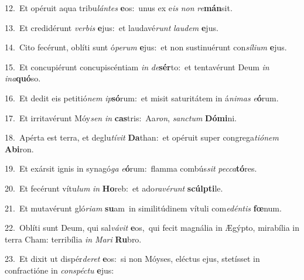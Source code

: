 {\numbfont\textcolor{\numbcolor}{12.}}~Et opéruit aqua tribu\-\textit{lán}\-\textit{tes} \textbf{e}\-os:~\star unus ex e\textit{is} \textit{non} \textit{re}\-\textbf{mán}sit.\par
{\numbfont\textcolor{\numbcolor}{13.}}~Et credidérunt \textit{ver}\-\textit{bis} \textbf{e}\-jus:~\star et laudavé\textit{runt} \textit{lau}\-\textit{dem} \textbf{e}\-jus.\par
{\numbfont\textcolor{\numbcolor}{14.}}~Cito fecérunt, oblíti sunt ó\-\textit{pe}\-\textit{rum} \textbf{e}\-jus:~\star et non sustinuérunt con\-\textit{sí}\-\textit{li}\textit{um} \textbf{e}\-jus.\par
{\numbfont\textcolor{\numbcolor}{15.}}~Et concupiérunt concupiscéntiam \textit{in} \textit{de}\-\textbf{sér}to:~\star et tentavérunt Deum \textit{in} \textit{in}\-\textit{a}\textbf{quó}so.\par
{\numbfont\textcolor{\numbcolor}{16.}}~Et dedit eis petitió\textit{nem} \textit{ip}\-\textbf{só}rum:~\star et misit saturitátem in á\-\textit{ni}\-\textit{mas} \textit{e}\-\textbf{ó}rum.\par
{\numbfont\textcolor{\numbcolor}{17.}}~Et irritavérunt Móy\textit{sen} \textit{in} \textbf{cas}\-tris:~\star Aa\-\textit{ron}\-, \textit{sanc}\-\textit{tum} \textbf{Dó}\-\textbf{mi}ni.\par
{\numbfont\textcolor{\numbcolor}{18.}}~Apérta est terra, et deglu\-\textit{tí}\-\textit{vit} \textbf{Da}\-than:~\star et opéruit super congrega\-\textit{ti}\-\textit{ó}\textit{nem} \textbf{Ab}\-\textbf{i}ron.\par
{\numbfont\textcolor{\numbcolor}{19.}}~Et exársit ignis in synagó\textit{ga} \textit{e}\-\textbf{ó}rum:~\star flamma combús\textit{sit} \textit{pec}\-\textit{ca}\textbf{tó}res.\par
{\numbfont\textcolor{\numbcolor}{20.}}~Et fecérunt vítu\textit{lum} \textit{in} \textbf{Ho}\-reb:~\star et ado\-\textit{ra}\-\textit{vé}\textit{runt} \textbf{scúlp}\-\textbf{ti}le.\par
{\numbfont\textcolor{\numbcolor}{21.}}~Et mutavérunt gló\-\textit{ri}\-\textit{am} \textbf{su}\-am~\star in similitúdinem vítuli com\-\textit{e}\-\textit{dén}\textit{tis} \textbf{fœ}\-num.\par
{\numbfont\textcolor{\numbcolor}{22.}}~Oblíti sunt Deum, qui sal\-\textit{vá}\-\textit{vit} \textbf{e}\-os,~\star qui fecit magnália in Ægýpto, mirabília in terra Cham: terribília \textit{in} \textit{Ma}\-\textit{ri} \textbf{Ru}\-bro.\par
{\numbfont\textcolor{\numbcolor}{23.}}~Et dixit ut dispér\-\textit{de}\-\textit{ret} \textbf{e}\-os:~\star si non Móyses, eléctus ejus, stetísset in confractióne in \textit{con}\-\textit{spéc}\textit{tu} \textbf{e}\-jus:\par
